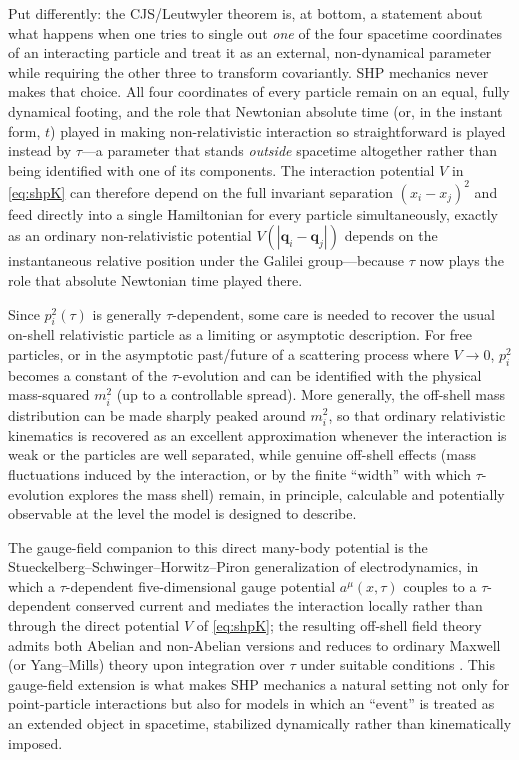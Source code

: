 Put differently: the CJS/Leutwyler theorem is, at bottom, a statement about
what happens when one tries to single out \emph{one} of the four spacetime
coordinates of an interacting particle and treat it as an external,
non-dynamical parameter while requiring the other three to transform
covariantly. SHP mechanics never makes that choice. All four coordinates of
every particle remain on an equal, fully dynamical footing, and the role that
Newtonian absolute time (or, in the instant form, $t$) played in making
non-relativistic interaction so straightforward is played instead by $\tau$---a
parameter that stands \emph{outside} spacetime altogether rather than being
identified with one of its components. The interaction potential $V$ in
\eqref{eq:shpK} can therefore depend on the full invariant separation
$(x_i-x_j)^2$ and feed directly into a single Hamiltonian for every particle
simultaneously, exactly as an ordinary non-relativistic potential $V(|{\bm
q}_i-{\bm q}_j|)$ depends on the instantaneous relative position under the
Galilei group---because $\tau$ now plays the role that absolute Newtonian time
played there.

Since $p_i^2(\tau)$ is generally $\tau$-dependent, some care is needed to
recover the usual on-shell relativistic particle as a limiting or asymptotic
description. For free particles, or in the asymptotic past/future of a
scattering process where $V\to0$, $p_i^2$ becomes a constant of the
$\tau$-evolution and can be identified with the physical mass-squared $m_i^2$
(up to a controllable spread). More generally, the off-shell mass distribution
can be made sharply peaked around $m_i^2$, so that ordinary relativistic
kinematics is recovered as an excellent approximation whenever the interaction
is weak or the particles are well separated, while genuine off-shell effects
(mass fluctuations induced by the interaction, or by the finite ``width'' with
which $\tau$-evolution explores the mass shell) remain, in principle,
calculable and potentially observable at the level the model is designed to
describe.

The gauge-field companion to this direct many-body potential is the
Stueckelberg--Schwinger--Horwitz--Piron generalization of electrodynamics, in
which a $\tau$-dependent five-dimensional gauge potential $a^\mu(x,\tau)$
couples to a $\tau$-dependent conserved current and mediates the interaction
locally rather than through the direct potential $V$ of \eqref{eq:shpK}; the
resulting off-shell field theory admits both Abelian and non-Abelian versions
and reduces to ordinary Maxwell (or Yang--Mills) theory upon integration over
$\tau$ under suitable conditions \cite{Horwitz2015}. This gauge-field extension
is what makes SHP mechanics a natural setting not only for point-particle
interactions but also for models in which an ``event'' is treated as an
extended object in spacetime, stabilized dynamically rather than kinematically
imposed.


